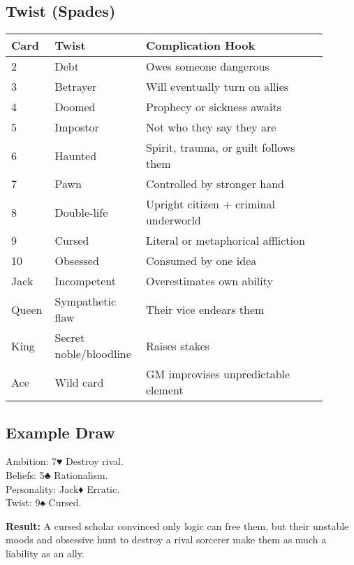 \documentclass[12pt]{article}
\begin{document}
\subsection*{Twist (Spades)}
\begin{longtable}{|p{0.1\linewidth}|p{0.25\linewidth}|p{0.55\linewidth}|}
\hline
\textbf{Card} & \textbf{Twist} & \textbf{Complication Hook} \\
\hline
2 & Debt & Owes someone dangerous \\
3 & Betrayer & Will eventually turn on allies \\
4 & Doomed & Prophecy or sickness awaits \\
5 & Impostor & Not who they say they are \\
6 & Haunted & Spirit, trauma, or guilt follows them \\
7 & Pawn & Controlled by stronger hand \\
8 & Double-life & Upright citizen + criminal underworld \\
9 & Cursed & Literal or metaphorical affliction \\
10 & Obsessed & Consumed by one idea \\
Jack & Incompetent & Overestimates own ability \\
Queen & Sympathetic flaw & Their vice endears them \\
King & Secret noble/bloodline & Raises stakes \\
Ace & Wild card & GM improvises unpredictable element \\
\hline
\end{longtable}

\subsection*{Example Draw}
\noindent Ambition: 7♥ Destroy rival. \\
Beliefs: 5♣ Rationalism. \\
Personality: Jack♦ Erratic. \\
Twist: 9♠ Cursed. \\
\medskip

\noindent \textbf{Result:} A cursed scholar convinced only logic can free them, but their unstable moods and obsessive hunt to destroy a rival sorcerer make them as much a liability as an ally.
\end{document}
